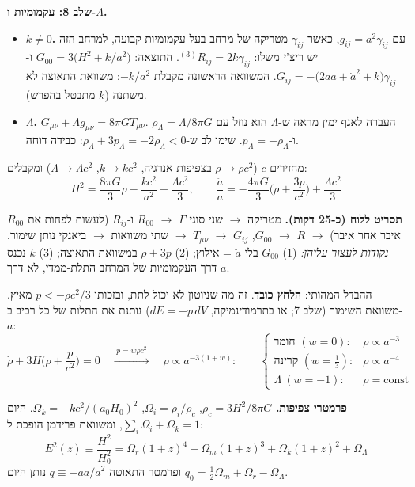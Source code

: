 \textbf{שלב 8: עקמומיות ו-$\Lambda$.}
\begin{itemize}
\item \textbf{$k\neq0$.} עם $g_{ij}=a^2\gamma_{ij}$, כאשר $\gamma_{ij}$ מטריקה של מרחב בעל עקמומיות קבועה, למרחב הזה יש ריצ'י משלו: ${}^{(3)}\!R_{ij}=2k\gamma_{ij}$. התוצאה: $G_{00}=3\big(H^2+k/a^2\big)$ ו-$G_{ij}=-\big(2a\ddot a+\dot a^2+k\big)\gamma_{ij}$. המשוואה הראשונה מקבלת $-k/a^2$; משוואת התאוצה לא משתנה ($k$ מתבטל בהפרש).
\item \textbf{$\Lambda$.} $G_{\mu\nu}+\Lambda g_{\mu\nu}=8\pi GT_{\mu\nu}$. העברה לאגף ימין מראה ש-$\Lambda$ הוא נוזל עם $\rho_\Lambda=\Lambda/8\pi G$ ו-$p_\Lambda=-\rho_\Lambda$. שימו לב ש-$\rho_\Lambda+3p_\Lambda=-2\rho_\Lambda<0$: כבידה דוחה.
\end{itemize}
מחזירים $c$ ($\rho\to\rho c^2$ בצפיפות אנרגיה, $k\to kc^2$, $\Lambda\to\Lambda c^2$) ומקבלים:
\begin{equation}
\boxed{\;H^2=\frac{8\pi G}{3}\rho-\frac{kc^2}{a^2}+\frac{\Lambda c^2}{3},\qquad
\frac{\ddot a}{a}=-\frac{4\pi G}{3}\Big(\rho+\frac{3p}{c^2}\Big)+\frac{\Lambda c^2}{3}\;}
\label{eq:friedmann}
\end{equation}

\begin{keybox}
\textbf{תסריט ללוח (כ-25 דקות).} מטריקה $\to$ שני סוגי $\Gamma$ $\to$ $R_{00}$ ו-$R_{ij}$ (לעשות לפחות את $R_{00}$ איבר אחר איבר) $\to$ $R$ $\to$ $G_{00}$, $G_{ij}$ $\to$ $T_{\mu\nu}$ $\to$ שתי משוואות $\to$ ביאנקי נותן שימור. \emph{נקודות לעצור עליהן:} (1) $G_{00}$ בלי $\ddot a$ = אילוץ; (2) $\rho+3p$ במשוואת התאוצה; (3) $k$ נכנס דרך העקמומיות של המרחב התלת-ממדי, לא דרך $a$.
\end{keybox}

ההבדל המהותי: \textbf{הלחץ כובד}. זה מה שניוטון לא יכול לתת, ובזכותו $p<-\rho c^2/3$ מאיץ.
משוואת השימור (שלב 7; או בתרמודינמיקה, $dE=-p\,dV$) נותנת את התלות של כל רכיב ב-$a$:
\begin{equation}
\dot\rho+3H\Big(\rho+\frac{p}{c^2}\Big)=0
\quad\xrightarrow{\;p=w\rho c^2\;}\quad
\rho\propto a^{-3(1+w)}:\qquad
\begin{cases}
\text{חומר } (w=0): & \rho\propto a^{-3}\\
\text{קרינה } (w=\tfrac13): & \rho\propto a^{-4}\\
\Lambda\ (w=-1): & \rho=\text{const}
\end{cases}
\end{equation}

\textbf{פרמטרי צפיפות.} $\rho_c=3H^2/8\pi G$, $\Omega_i=\rho_i/\rho_c$, $\Omega_k=-kc^2/(a_0H_0)^2$. היום $\sum_i\Omega_{i}+\Omega_k=1$, ומשוואת פרידמן הופכת ל:
\begin{equation}
\boxed{\;E^2(z)\equiv\frac{H^2}{H_0^2}=\Omega_r(1+z)^4+\Omega_m(1+z)^3+\Omega_k(1+z)^2+\Omega_\Lambda\;}
\label{eq:Ez}
\end{equation}
ופרמטר התאוטה $q\equiv-\ddot a a/\dot a^2$ נותן היום $q_0=\tfrac12\Omega_m+\Omega_r-\Omega_\Lambda$.

